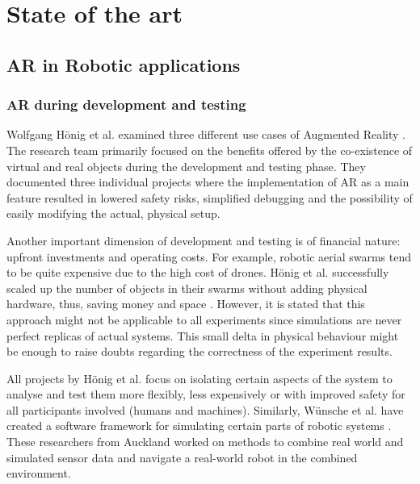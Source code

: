 \chapter{State of the art}\label{Chap:StateOfTheArt}

\section{AR in Robotic applications}
\subsection{AR during development and testing}
Wolfgang Hönig et al. examined three different use cases of Augmented Reality \cite{hoenig2015mixed}. The research team primarily focused on the benefits offered by the co-existence of virtual and real objects during the development and testing phase. They documented three individual projects where the implementation of AR as a main feature resulted in lowered safety risks, simplified debugging and the possibility of easily modifying the actual, physical setup.

Another important dimension of development and testing is of financial nature: upfront investments and operating costs. For example, robotic aerial swarms tend to be quite expensive due to the high cost of drones. Hönig et al. successfully scaled up the number of objects in their swarms without adding physical hardware, thus, saving money and space \cite{hoenig2015mixed}. However, it is stated that this approach might not be applicable to all experiments since simulations are never perfect replicas of actual systems. This small delta in physical behaviour might be enough to raise doubts regarding the correctness of the experiment results.

All projects by Hönig et al. focus on isolating certain aspects of the system to analyse and test them
more flexibly, less expensively or with improved safety for all participants involved (humans and
machines). Similarly, Wünsche et al. have created a software framework for simulating certain parts
of robotic systems \cite{chen2009mixed}. These researchers from Auckland worked on methods to combine real world
and simulated sensor data and navigate a real-world robot in the combined environment.

